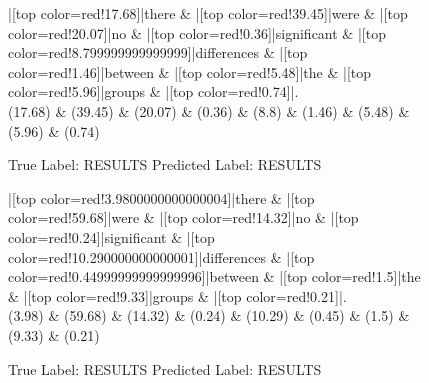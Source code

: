 \documentclass[a4paper, landscape]{article}
\begin{document}
\begin{figure}
\begin{center}
\begin{dependency}
\begin{deptext}
|[top color=red!17.68]|there \& |[top color=red!39.45]|were \& |[top color=red!20.07]|no \& |[top color=red!0.36]|significant \& |[top color=red!8.799999999999999]|differences \& |[top color=red!1.46]|between \& |[top color=red!5.48]|the \& |[top color=red!5.96]|groups \& |[top color=red!0.74]|.\\
(17.68) \& (39.45) \& (20.07) \& (0.36) \& (8.8) \& (1.46) \& (5.48) \& (5.96) \& (0.74)\\
\end{deptext}
\end{dependency}
\end{center}
\caption{True Label: RESULTS Predicted Label: RESULTS}
\end{figure}
\clearpage
\begin{figure}
\begin{center}
\begin{dependency}
\begin{deptext}
|[top color=red!3.9800000000000004]|there \& |[top color=red!59.68]|were \& |[top color=red!14.32]|no \& |[top color=red!0.24]|significant \& |[top color=red!10.290000000000001]|differences \& |[top color=red!0.44999999999999996]|between \& |[top color=red!1.5]|the \& |[top color=red!9.33]|groups \& |[top color=red!0.21]|.\\
(3.98) \& (59.68) \& (14.32) \& (0.24) \& (10.29) \& (0.45) \& (1.5) \& (9.33) \& (0.21)\\
\end{deptext}
\end{dependency}
\end{center}
\caption{True Label: RESULTS Predicted Label: RESULTS}
\end{figure}
\end{document}
